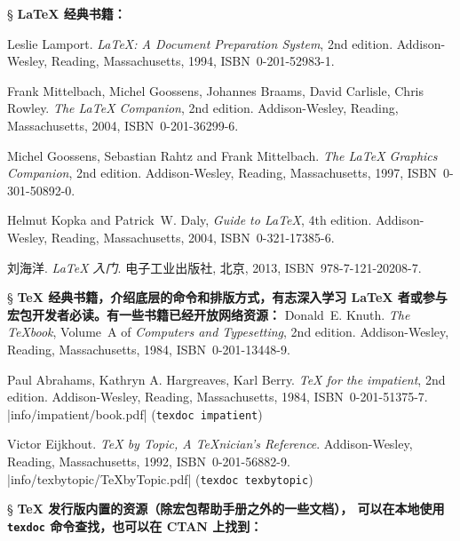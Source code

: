 \begin{thebibliography}{20}

\item[\S] {\bfseries \LaTeX{} 经典书籍：}

 Leslie Lamport.
  \newblock \emph{\LaTeX: A Document Preparation System}, 2nd edition.
  \newblock Addison-Wesley, Reading, Massachusetts, 1994, ISBN~0-201-52983-1.

 Frank Mittelbach, Michel Goossens, Johannes Braams, David Carlisle, Chris Rowley.
  \newblock \emph{The \LaTeX{} Companion}, 2nd edition.
  \newblock Addison-Wesley, Reading, Massachusetts, 2004, ISBN~0-201-36299-6.

 Michel Goossens, Sebastian Rahtz and Frank Mittelbach.
  \newblock \emph{The \LaTeX{} Graphics Companion}, 2nd edition.
  \newblock Addison-Wesley, Reading, Massachusetts, 1997, ISBN~0-301-50892-0.

 Helmut Kopka and Patrick~W. Daly,
  \newblock \emph{Guide to \LaTeX}, 4th edition.
  \newblock Addison-Wesley, Reading, Massachusetts, 2004, ISBN~0-321-17385-6.

 刘海洋.
  \newblock \emph{\LaTeX{} 入门}.
  \newblock 电子工业出版社, 北京, 2013, ISBN~978-7-121-20208-7.

\item[\S] {\bfseries \TeX{} 经典书籍，介绍底层的命令和排版方式，有志深入学习 \LaTeX{} 者或参与宏包开发者必读。有一些书籍已经开放网络资源：}
 Donald~E. Knuth.
  \newblock \emph{The \TeX book}, Volume~A of \textit{Computers and Typesetting}, 2nd edition.
  \newblock Addison-Wesley, Reading, Massachusetts, 1984, ISBN~0-201-13448-9.

 Paul Abrahams, Kathryn A. Hargreaves, Karl Berry.
  \newblock \emph{\TeX{} for the impatient}, 2nd edition.
  \newblock Addison-Wesley, Reading, Massachusetts, 1984, ISBN~0-201-51375-7. \\
  \CTAN|info/impatient/book.pdf| (\texttt{texdoc impatient})

 Victor Eijkhout.
  \newblock \emph{\TeX{} by Topic, A \TeX nician's Reference}.
  \newblock Addison-Wesley, Reading, Massachusetts, 1992, ISBN~0-201-56882-9. \\
  \CTAN|info/texbytopic/TeXbyTopic.pdf| (\texttt{texdoc texbytopic})

\item[\S] {\bfseries \TeX{} 发行版内置的资源（除宏包帮助手册之外的一些文档），
  可以在本地使用 \texttt{texdoc} 命令查找，也可以在 CTAN 上找到：}


\end{thebibliography}
